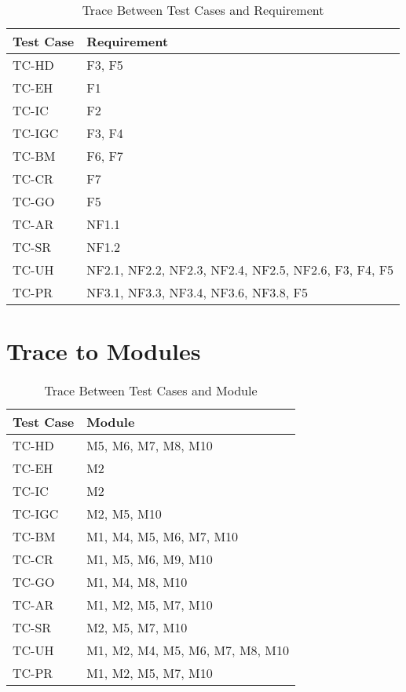 \documentclass[12pt, titlepage]{article}
\begin{document}
	\begin{table}[H]
    \centering
    \begin{tabular}{p{} p{}}
    \toprule
    \textbf{Test Case} & \textbf{Requirement}\\
    \midrule
    TC-HD  & F3, F5\\
    TC-EH  & F1\\
    TC-IC  & F2\\
    TC-IGC  & F3, F4\\
    TC-BM  & F6, F7\\
    TC-CR  & F7\\
    TC-GO  & F5\\
    TC-AR & NF1.1\\
    TC-SR & NF1.2\\
    TC-UH & NF2.1, NF2.2, NF2.3, NF2.4, NF2.5, NF2.6, F3, F4, F5\\
    TC-PR & NF3.1, NF3.3, NF3.4, NF3.6, NF3.8, F5\\
    
    \bottomrule
    \end{tabular}
    \caption{Trace Between Test Cases and Requirement}
    \end{table}
		
\section{Trace to Modules}		

\begin{table}[H]
    \centering
    \begin{tabular}{p{} p{}}
    \toprule
    \textbf{Test Case} & \textbf{Module}\\
    \midrule
    TC-HD  & M5, M6, M7, M8, M10\\
    TC-EH  & M2\\
    TC-IC  & M2\\
    TC-IGC  & M2, M5, M10\\
    TC-BM  & M1, M4, M5, M6, M7, M10\\
    TC-CR  & M1, M5, M6, M9, M10\\
    TC-GO  & M1, M4, M8, M10\\
    TC-AR & M1, M2, M5, M7, M10\\
    TC-SR & M2, M5, M7, M10\\
    TC-UH & M1, M2, M4, M5, M6, M7, M8, M10\\
    TC-PR & M1, M2, M5, M7, M10\\
    
    \bottomrule
    \end{tabular}
    \caption{Trace Between Test Cases and Module}
\end{table}
\end{document}
